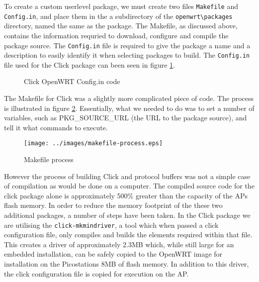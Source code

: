 	To create a custom userlevel package, we must create two files \texttt{Makefile} and \texttt{Config.in}, and place them in the a subdirectory of the \texttt{openwrt\textbackslash packages} directory, named the same as the package. The Makefile, as discussed above, contains the information requried to download, configure and compile the package source. The \texttt{Config.in} file is required to give the package a name and a description to easily identify it when selecting packages to build. The \texttt{Config.in} file used for the Click package can been seen in figure \ref{fig:config.in}.

	\begin{figure}[ht]    
	  
	  \caption{Click OpenWRT Config.in code}
	  \label{fig:config.in}
	\end{figure}

	The Makefile for Click was a slightly more complicated piece of code. The process is illustrated in figure \ref{fig:makefile-process}. Essentially, what we needed to do was to set a number of variables, such as PKG\_SOURCE\_URL (the URL to the package source), and tell it what commands to execute.
	
	\begin{figure}[ht]
	  \centering
	  \texttt{[image: ../images/makefile-process.eps]}
	  \caption{Makefile process}
	  \label{fig:makefile-process}
	\end{figure}

	However the process of building Click and protocol buffers was not a simple case of compilation as would be done on a computer. The compiled source code for the click package alone is approximately 500\% greater than the capacity of the APs flash memory. In order to reduce the memory footprint of the these two additional packages, a number of steps have been taken. In the Click package we are utilising the \texttt{click-mkmindriver}, a tool which when passed a click configuration file, only compiles and builds the elements required within that file. This creates a driver of approximately 2.3MB which, while still large for an embedded installation, can be safely copied to the OpenWRT image for installation on the Picostations 8MB of flash memory. In addition to this driver, the click configuration file is copied for execution on the AP.
	

